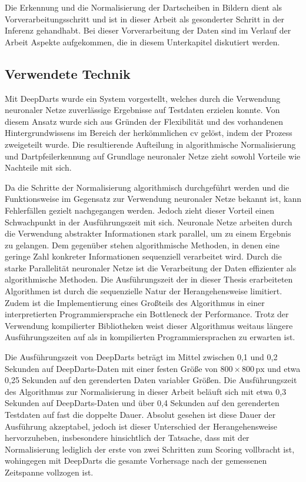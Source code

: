 Die Erkennung und die Normalisierung der Dartscheiben in Bildern dient als Vorverarbeitungsschritt und ist in dieser Arbeit als gesonderter Schritt in der Inferenz gehandhabt. Bei dieser Vorverarbeitung der Daten sind im Verlauf der Arbeit Aspekte aufgekommen, die in diesem Unterkapitel diskutiert werden.

\subsection{Verwendete Technik}

Mit DeepDarts wurde ein System vorgestellt, welches durch die Verwendung neuronaler Netze zuverlässige Ergebnisse auf Testdaten erzielen konnte. Von diesem Ansatz wurde sich aus Gründen der Flexibilität und des vorhandenen Hintergrundwissens im Bereich der herkömmlichen \ac{cv} gelöst, indem der Prozess zweigeteilt wurde. Die resultierende Aufteilung in algorithmische Normalisierung und Dartpfeilerkennung auf Grundlage neuronaler Netze zieht sowohl Vorteile wie Nachteile mit sich.

Da die Schritte der Normalisierung algorithmisch durchgeführt werden und die Funktionsweise im Gegensatz zur Verwendung neuronaler Netze bekannt ist, kann Fehlerfällen gezielt nachgegangen werden. Jedoch zieht dieser Vorteil einen Schwachpunkt in der Ausführungszeit mit sich. Neuronale Netze arbeiten durch die Verwendung abstrakter Informationen stark parallel, um zu einem Ergebnis zu gelangen. Dem gegenüber stehen algorithmische Methoden, in denen eine geringe Zahl konkreter Informationen sequenziell verarbeitet wird. Durch die starke Parallelität neuronaler Netze ist die Verarbeitung der Daten effizienter als algorithmische Methoden. Die Ausführungszeit der in dieser Thesis erarbeiteten Algorithmen ist durch die sequenzielle Natur der Herangehensweise limitiert. Zudem ist die Implementierung eines Großteils des Algorithmus in einer interpretierten Programmiersprache ein Bottleneck der Performance. Trotz der Verwendung kompilierter Bibliotheken weist dieser Algorithmus weitaus längere Ausführungszeiten auf als in kompilierten Programmiersprachen zu erwarten ist.

Die Ausführungszeit von DeepDarts beträgt im Mittel zwischen 0,1 und 0,2 Sekunden auf DeepDarts-Daten mit einer festen Größe von $800 \times 800\,\text{px}$ und etwa 0,25 Sekunden auf den gerenderten Daten variabler Größen. Die Ausführungszeit des Algorithmus zur Normalisierung in dieser Arbeit beläuft sich mit etwa 0,3 Sekunden auf DeepDarts-Daten und über 0,4 Sekunden auf den gerenderten Testdaten auf fast die doppelte Dauer. Absolut gesehen ist diese Dauer der Ausführung akzeptabel, jedoch ist dieser Unterschied der Herangehensweise hervorzuheben, insbesondere hinsichtlich der Tatsache, dass mit der Normalisierung lediglich der erste von zwei Schritten zum Scoring vollbracht ist, wohingegen mit DeepDarts die gesamte Vorhersage nach der gemessenen Zeitspanne vollzogen ist.

